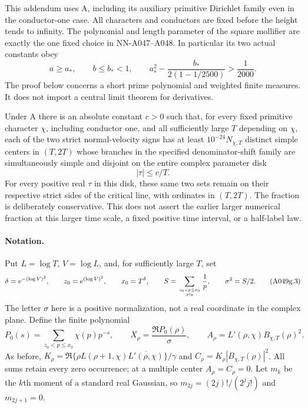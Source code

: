 This addendum uses A, including its auxiliary primitive Dirichlet
family even in the conductor-one case. All characters and conductors
are fixed before the height tends to infinity. The polynomial and
length parameter of the square mollifier are exactly the one fixed
choice in NN-A047--A048. In particular its two actual constants obey
\[
 a\ge a_*,\qquad b\le b_*<1,\qquad
 a_*^2-\frac{b_*}{2(1-1/2500)}>\frac1{2000}.
\tag{A049g.1}
\]
The proof below concerns a short prime polynomial and weighted finite
measures. It does not import a central limit theorem for derivatives.

\begin{theorem}
\label{thm:A049-critical-disk}
Under A there is an absolute constant $c>0$ such that, for every
fixed primitive character $\chi$, including conductor one, and all
sufficiently large $T$ depending on $\chi$, each of the two strict
normal-velocity signs has at least $10^{-24}N_{\chi,T}$ distinct
simple centers in $(T,2T)$ whose branches in the specified
denominator-shift family are simultaneously simple and disjoint on
the entire complex parameter disk
\[
                              |\tau|\le c/T.
\tag{A049g.2}
\]
For every positive real $\tau$ in this disk, these same two sets
remain on their respective strict sides of the critical line, with
ordinates in $(T,2T)$. The fraction is deliberately conservative.
This does not assert the earlier larger numerical fraction at this
larger time scale, a fixed positive time interval, or a half-label law.
\end{theorem}

\paragraph{Notation.}
Put $L=\log T$, $V=\log L$, and, for sufficiently large $T$, set
\[
 \delta=e^{-(\log V)^2},\qquad z_0=e^{(\log V)^2},\qquad
 x_0=T^\delta,\qquad
 S=\sum_{z_0<p\le x_0\atop p\nmid q}\frac1p,\qquad
 \sigma^2=S/2.
\tag{A049g.3}
\]
The letter $\sigma$ here is a positive normalization, not a real
coordinate in the complex plane. Define the finite polynomial
\[
 P_0(s)=\sum_{z_0<p\le x_0}\chi(p)p^{-s},\qquad
 X_\rho=\frac{\Re P_0(\rho)}{\sigma},\qquad
 A_\rho=L'(\rho,\chi)B_{\chi,T}(\rho)^2.
\tag{A049g.4}
\]
As before, $K_\rho=\Re\{\rho L(\rho+1,\chi)
\overline{L'(\rho,\chi)}\}/\gamma$ and
$C_\rho=K_\rho|B_{\chi,T}(\rho)|^2$. All sums retain every zero
occurrence; at a multiple center $A_\rho=C_\rho=0$.
Let $m_k$ be the $k$th moment of a standard real Gaussian, so
$m_{2j}=(2j)!/(2^j j!)$ and $m_{2j+1}=0$.

